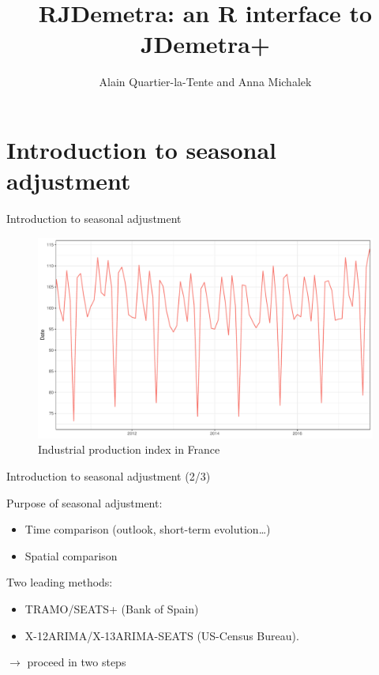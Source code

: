 \documentclass[10pt,xcolor=table,color={dvipsnames,usenames},ignorenonframetext,usepdftitle=false,french]{beamer}
\title{RJDemetra: an R interface to JDemetra+}
\author{Alain Quartier-la-Tente and Anna Michalek}
\date{}
\providecommand{\tightlist}{%
  \setlength{\parskip}{0pt}
  }
\begin{document}
\begin{frame}
\titlepage
\end{frame}

\hypertarget{introduction-to-seasonal-adjustment}{%
\section{Introduction to seasonal
adjustment}\label{introduction-to-seasonal-adjustment}}

\begin{frame}{Introduction to seasonal adjustment}
\protect\hypertarget{introduction-to-seasonal-adjustment-1}{}

\begin{figure}
\centering
\includegraphics{img/markdown-unnamed-chunk-1-1.pdf}
\caption{Industrial production index in France}
\end{figure}

\end{frame}

\begin{frame}{Introduction to seasonal adjustment (2/3)}
\protect\hypertarget{introduction-to-seasonal-adjustment-23}{}

Purpose of seasonal adjustment:

\begin{itemize}
\tightlist
\item
  Time comparison (outlook, short-term evolution\ldots{})\\
\item
  Spatial comparison
\end{itemize}

\bigskip
\pause

Two leading methods:

\begin{itemize}
\tightlist
\item
  TRAMO/SEATS+ (Bank of Spain)\\
\item
  X-12ARIMA/X-13ARIMA-SEATS (US-Census Bureau).
\end{itemize}

\bigskip
\pause

\(\rightarrow\) proceed in two steps

\end{frame}
\end{document}
